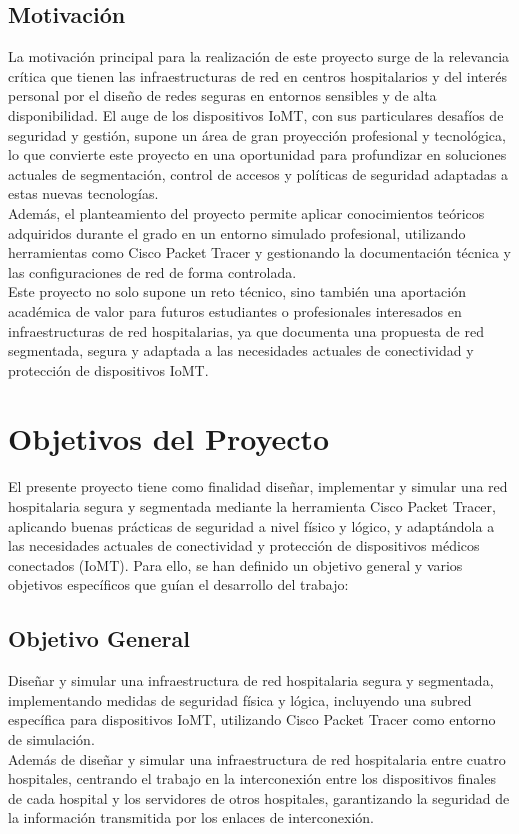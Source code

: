 \subsection{Motivación}
La motivación principal para la realización de este proyecto surge de la relevancia crítica que tienen las infraestructuras de red en centros 
hospitalarios y del interés personal por el diseño de redes seguras en entornos sensibles y de alta disponibilidad. El auge de los dispositivos IoMT, con sus particulares 
desafíos de seguridad y gestión, supone un área de gran proyección profesional y tecnológica, lo que convierte este proyecto en una oportunidad para profundizar en soluciones 
actuales de segmentación, control de accesos y políticas de seguridad adaptadas a estas nuevas tecnologías. \\

Además, el planteamiento del proyecto permite aplicar conocimientos teóricos adquiridos durante el grado en un entorno simulado profesional, utilizando herramientas como 
Cisco Packet Tracer y gestionando la documentación técnica y las configuraciones de red de forma controlada. \\

Este proyecto no solo supone un reto técnico, sino también una aportación académica de valor para futuros estudiantes o profesionales interesados en infraestructuras de 
red hospitalarias, ya que documenta una propuesta de red segmentada, segura y adaptada a las necesidades actuales de conectividad y protección de dispositivos IoMT.

\section{Objetivos del Proyecto}
El presente proyecto tiene como finalidad diseñar, implementar y simular una red hospitalaria segura y segmentada mediante la herramienta Cisco Packet Tracer, aplicando buenas 
prácticas de seguridad a nivel físico y lógico, y adaptándola a las necesidades actuales de conectividad y protección de dispositivos médicos conectados (IoMT). Para ello, 
se han definido un objetivo general y varios objetivos específicos que guían el desarrollo del trabajo:

\subsection{Objetivo General}
Diseñar y simular una infraestructura de red hospitalaria segura y segmentada, implementando medidas de seguridad física y lógica, incluyendo una subred específica para 
dispositivos \ac{IoMT}, utilizando Cisco Packet Tracer como entorno de simulación.
\\
Además de diseñar y simular una infraestructura de red hospitalaria entre cuatro hospitales, centrando el trabajo en la interconexión entre los dispositivos finales de cada hospital 
y los servidores de otros hospitales, garantizando la seguridad de la información transmitida por los enlaces de interconexión.

